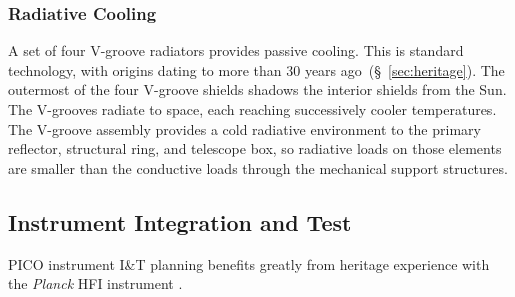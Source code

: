 

\subsubsection{Radiative Cooling}
\label{sec:radiative_cooling} %

A set of four V-groove radiators provides passive cooling. This is standard technology, with origins dating to more than 30 years ago~(\S~\ref{sec:heritage}). The outermost of the four V-groove shields shadows the interior shields from the Sun. The V-grooves radiate to space, each reaching successively cooler temperatures.
The V-groove assembly provides a cold radiative environment to the primary reflector, structural ring, and telescope box, so radiative loads on those elements are smaller than the conductive loads through the mechanical support structures.


\subsection{Instrument Integration and Test}
\label{sec:iandt} %

PICO instrument I\&T planning benefits greatly from heritage
experience with the \textit{Planck} HFI instrument \citep{ Pajot2010}.

